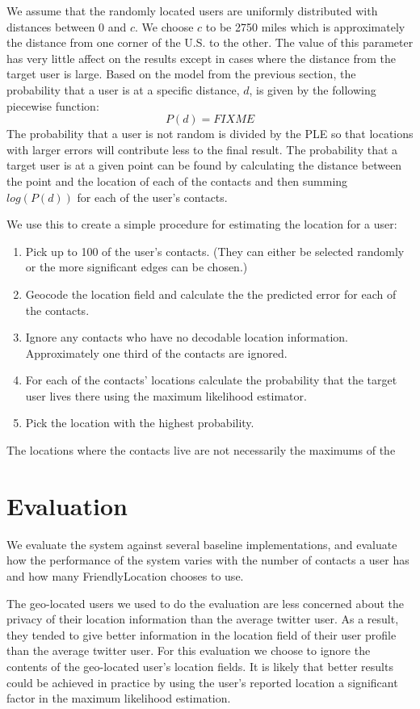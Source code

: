 We assume that the randomly located users are uniformly distributed with
distances between 0 and \(c\). We choose \(c\) to be 2750 miles which is
approximately the distance from one corner of the U.S. to the other. The value
of this parameter has very little affect on the results except in cases where
the distance from the target user is large.
Based on the model from the previous section, the probability that a user is at
a specific distance, \(d\), is given by the following piecewise function:
\begin{displaymath}
    P(d) = FIXME
\end{displaymath}
The probability that a user is not random is divided by the PLE so that
locations with larger errors will contribute less to the final result.
The probability that a target user is at a given point can be found by
calculating the distance between the point and the location of each of the
contacts and then summing \(log(P(d))\) for each of the user's contacts.

We use this to create a simple procedure for estimating the location for a user:
\begin{enumerate}
\item Pick up to 100 of the user's contacts. (They can either be selected randomly or the more significant edges can be chosen.)
\item Geocode the location field and calculate the the predicted error for each of the contacts.
\item Ignore any contacts who have no decodable location information. Approximately one third of the contacts are ignored.
\item For each of the contacts' locations calculate the probability that the target user lives there using the maximum likelihood estimator.
\item Pick the location with the highest probability.
\end{enumerate}
The locations where the contacts live are not necessarily the maximums of the 

\section{Evaluation}
We evaluate the system against several baseline implementations, and evaluate
how the performance of the system varies with the number of contacts a user has
and how many FriendlyLocation chooses to use.

The geo-located users we used to do the evaluation are less concerned about the
privacy of their location information than the average twitter user.
As a result, they tended to give better information in the location field of
their user profile than the average twitter user.
For this evaluation we choose to ignore the contents of the geo-located user's
location fields.
It is likely that better results could be achieved in practice
by using the user's reported location a significant factor in the maximum
likelihood estimation.

